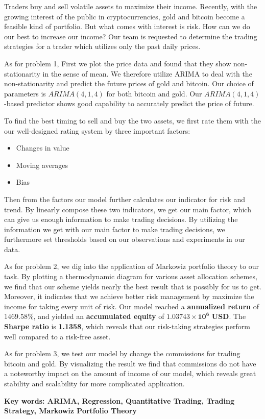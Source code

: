 \documentclass[12pt,a4paper]{article}
\newcommand{\Predictor}{ARIMA }
\begin{document}
\begin{spacing}{1.2}   %



Traders buy and sell volatile assets to maximize their income. Recently, with the growing interest of the public in cryptocurrencies, gold and bitcoin become a feasible kind of portfolio. But what comes with interest is risk. How can we do our best to increase our income? Our team is requested to determine the trading strategies for a trader which utilizes only the past daily prices. 

As for problem 1, First we plot the price data and found that they show non-stationarity in the sense of mean. We therefore utilize \Predictor to deal with the non-stationarity and predict the future prices of gold and bitcoin. Our choice of parameters is $ARIMA(4,1,4)$ for both bitcoin and gold. Our $ARIMA(4,1,4)$-based predictor shows good capability to accurately predict the price of future.

To find the best timing to sell and buy the two assets, we first rate them with the our well-designed rating system by three important factors:

\begin{itemize}
	\item Changes in value
	\item Moving averages
	\item Bias
\end{itemize}
 

Then from the factors our model further calculates our indicator for risk and trend. By linearly compose these two indicators, we get our main factor, which can give us enough information to make trading decisions. By utilizing the information we get with our main factor to make trading decisions, we furthermore set thresholds based on our observations and experiments in our data. 

As for problem 2, we dig into the application of Markowiz portfolio theory to our task. By plotting a thermodynamic diagram for various asset allocation schemes, we find that our scheme yields nearly the best result that is possibly for us to get. Moreover, it indicates that we achieve better risk management by maximize the income for taking every unit of risk.
Our model reached a \textbf{annualized return} of $\mathbf{1469.58\%}$, and yielded an \textbf{accumulated equity} of $\mathbf{1.03743 \times 10^6}$ \textbf{USD}. The \textbf{Sharpe ratio} is \textbf{1.1358}, which reveals that our risk-taking strategies perform well compared to a risk-free asset.

As for problem 3, we test our model by change the commissions for trading bitcoin and gold. By visualizing the result we find that commissions do not have a noteworthy impact on the amount of income of our model, which reveals great stability and scalability for more complicated application.




\textbf{Key words: ARIMA, Regression, Quantitative Trading, Trading Strategy, Markowiz Portfolio Theory} 

\end{spacing}
\end{document}
